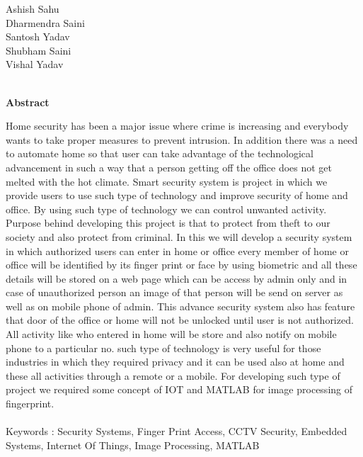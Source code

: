 \documentclass[twoside,a4paper,16pt]{book}
\begin{document}
{{{ \vspace{2cm}
Ashish Sahu\\
Dharmendra Saini\\
Santosh Yadav\\
Shubham Saini\\
Vishal Yadav\\ \\}
\newpage
\begin{center}
	\huge{\bf Abstract}
\end{center}
\vspace{1.5cm}
\large Home security has been a major issue where crime is increasing and everybody wants to take proper measures to
prevent intrusion. In addition there was a need to automate home so that user can take advantage of the technological
advancement in such a way that a person getting off the office does not get melted with the hot climate. Smart
security system is project in which we provide users to use such type of technology and improve security of home and
office. By using such type of technology we can control unwanted activity. Purpose behind developing this project is
that to protect from theft to our society and also protect from criminal. In this we will develop a security system in
which authorized users can enter in home or office every member of home or office will be identified by its finger print
or face by using biometric and all these details will be stored on a web page which can be access by admin only and
in case of unauthorized person an image of that person will be send on server as well as on mobile phone of admin.
This advance security system also has feature that door of the office or home will not be unlocked until user is not
authorized. All activity like who entered in home will be store and also notify on mobile phone to a particular no.
such type of technology is very useful for those industries in which they required privacy and it can be used also at
home and these all activities through a remote or a mobile. For developing such type of project we required some
concept of IOT and MATLAB for image processing of fingerprint.\\\\
Keywords : Security Systems, Finger Print Access, CCTV Security, Embedded Systems, Internet Of Things, Image
Processing, MATLAB\\


\newpage
\mainmatter
\tableofcontents
\listoffigures
\listoftables


\contentstyleisdeshed

}}
\end{document}
